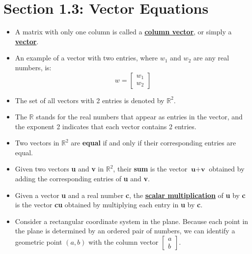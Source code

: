 \documentclass{article}
\newcommand{\definition}[1]{\underline{\textbf{#1}}}
\begin{document}
\section*{Section 1.3: Vector Equations}

\begin{itemize}

  \item A matrix with only one column is called a \definition{column vector}, or simply a \definition{vector}.
  
  \item An example of a vector with two entries, where $w_1$ and $w_2$ are any real numbers, is:
  \begin{equation*}
      w = \begin{bmatrix}
        w_1 \\ w_2
      \end{bmatrix}
  \end{equation*}

  \item The set of all vectors with 2 entries is denoted by $\mathbb{R}^2$.
  
  \item The $\mathbb{R}$ stands for the real numbers that appear as entries in the vector, and the exponent 2 indicates that each vector contains 2 entries.
  
  \item Two vectors in $\mathbb{R}^2$ are \textbf{equal} if and only if their corresponding entries are equal.
  
  \item Given two vectors \textbf{u} and \textbf{v} in $\mathbb{R}^2$, their \textbf{sum} is the vector $\textbf{u} + \textbf{v}$ obtained by adding the corresponding entries of \textbf{u} and \textbf{v}.
  
  \item Given a vector \textbf{u} and a real number \textbf{c}, the \definition{scalar multiplication} of \textbf{u} by \textbf{c} is the vector \textbf{cu} obtained by multiplying each entry in \textbf{u} by \textbf{c}.
  
  \item Consider a rectangular coordinate system in the plane. Because each point in the plane is determined by an ordered pair of numbers, we can identify a geometric point $(a,b)$ with the column vector 
  $\begin{bmatrix}
    a \\ b
  \end{bmatrix}$.


\end{itemize}
\end{document}
